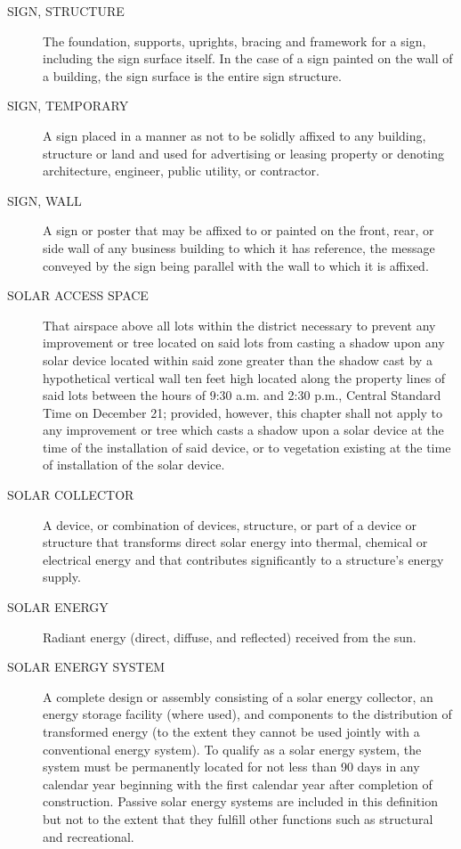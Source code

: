 \begin{description}
    \item[SIGN, STRUCTURE] The foundation, supports, uprights, bracing and framework for a sign, including the sign surface itself.  In the case of a sign painted on the wall of a building, the sign surface is the entire sign structure.
    \item[SIGN, TEMPORARY] A sign placed in a manner as not to be solidly affixed to any building, structure or land and used for advertising or leasing property or denoting architecture, engineer, public utility, or contractor.
    \item[SIGN, WALL] A sign or poster that may be affixed to or painted on the front, rear, or side wall of any business building to which it has reference, the message conveyed by the sign being parallel with the wall to which it is affixed.
    \item[SOLAR ACCESS SPACE] That airspace above all lots within the district necessary to prevent any improvement or tree located on said lots from casting a shadow upon any solar device located within said zone greater than the shadow cast by a hypothetical vertical wall ten feet high located along the property lines of said lots between the hours of 9:30 a.m. and 2:30 p.m., Central Standard Time on December 21; provided, however, this chapter shall not apply to any improvement or tree which casts a shadow upon a solar device at the time of the installation of said device, or to vegetation existing at the time of installation of the solar device.
    \item[SOLAR COLLECTOR] A device, or combination of devices, structure, or part of a device or structure that transforms direct solar energy into thermal, chemical or electrical energy and that contributes significantly to a structure’s energy supply.
    \item[SOLAR ENERGY] Radiant energy (direct, diffuse, and reflected) received from the sun.
    \item[SOLAR ENERGY SYSTEM] A complete design or assembly consisting of a solar energy collector, an energy storage facility (where used), and components to the distribution of transformed energy (to the extent they cannot be used jointly with a conventional energy system). To qualify as a solar energy system, the system must be permanently located for not less than 90 days in any calendar year beginning with the first calendar year after completion of construction. Passive solar energy systems are included in this definition but not to the extent that they fulfill other functions such as structural and recreational.

\end{description}
